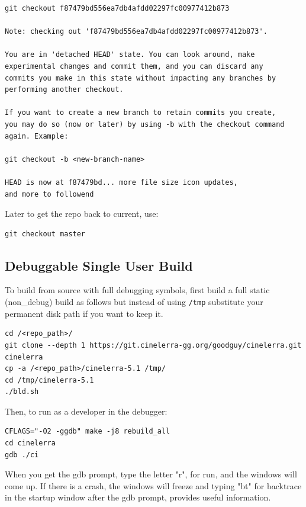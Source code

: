 \begin{lstlisting}[style=nil]
git checkout f87479bd556ea7db4afdd02297fc00977412b873

Note: checking out 'f87479bd556ea7db4afdd02297fc00977412b873'.

You are in 'detached HEAD' state. You can look around, make
experimental changes and commit them, and you can discard any
commits you make in this state without impacting any branches by
performing another checkout.

If you want to create a new branch to retain commits you create,
you may do so (now or later) by using -b with the checkout command
again. Example:

git checkout -b <new-branch-name>

HEAD is now at f87479bd... more file size icon updates,
and more to followend
\end{lstlisting}

Later to get the repo back to current, use:
\begin{lstlisting}[style=sh]
git checkout master
\end{lstlisting}


\subsection{Debuggable Single User Build}%
\label{sub:debuggable_single_user_build}

To build from source with full debugging symbols, first build a full
static (non\_debug) build as follows but instead of using
\texttt{/tmp} substitute your permanent disk path if you want to
keep it.

\begin{lstlisting}[style=sh]
cd /<repo_path>/
git clone --depth 1 https://git.cinelerra-gg.org/goodguy/cinelerra.git cinelerra
cp -a /<repo_path>/cinelerra-5.1 /tmp/
cd /tmp/cinelerra-5.1
./bld.sh
\end{lstlisting}

Then, to run as a developer in the debugger:

\begin{lstlisting}[style=sh]
CFLAGS="-O2 -ggdb" make -j8 rebuild_all
cd cinelerra
gdb ./ci
\end{lstlisting}

When you get the gdb prompt, type the letter "r", for run, and the windows will come up.
If there is a crash, the windows will freeze and typing "bt" for backtrace in the startup window
after the gdb prompt, provides useful information.


